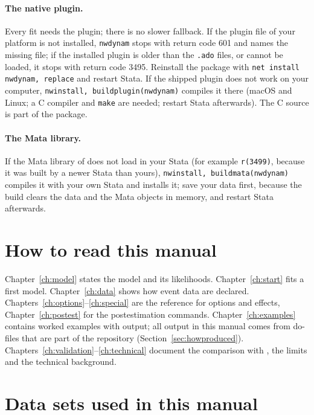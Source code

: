 \paragraph{The native plugin.} Every fit needs the plugin; there is no slower fallback. If the plugin file of your platform is not installed, \texttt{nwdynam} stops with return code 601 and names the missing file; if the installed plugin is older than the \texttt{.ado} files, or cannot be loaded, it stops with return code 3495. Reinstall the package with \texttt{net install nwdynam, replace} and restart Stata. If the shipped plugin does not work on your computer, \texttt{nwinstall, buildplugin(nwdynam)} compiles it there (macOS and Linux; a C compiler and \texttt{make} are needed; restart Stata afterwards). The C source is part of the package.

\paragraph{The Mata library.} If the Mata library of \nwdynam{} does not load in your Stata (for example \texttt{r(3499)}, because it was built by a newer Stata than yours), \texttt{nwinstall, buildmata(nwdynam)} compiles it with your own Stata and installs it; save your data first, because the build clears the data and the Mata objects in memory, and restart Stata afterwards.

\section{How to read this manual}

Chapter~\ref{ch:model} states the model and its likelihoods. Chapter~\ref{ch:start} fits a first model. Chapter~\ref{ch:data} shows how event data are declared. Chapters~\ref{ch:options}--\ref{ch:special} are the reference for options and effects, Chapter~\ref{ch:postest} for the postestimation commands. Chapter~\ref{ch:examples} contains worked examples with output; all output in this manual comes from do-files that are part of the repository (Section~\ref{sec:howproduced}). Chapters~\ref{ch:validation}--\ref{ch:technical} document the comparison with \goldfish{}, the limits and the technical background.

\section{Data sets used in this manual}\label{sec:datasets}

